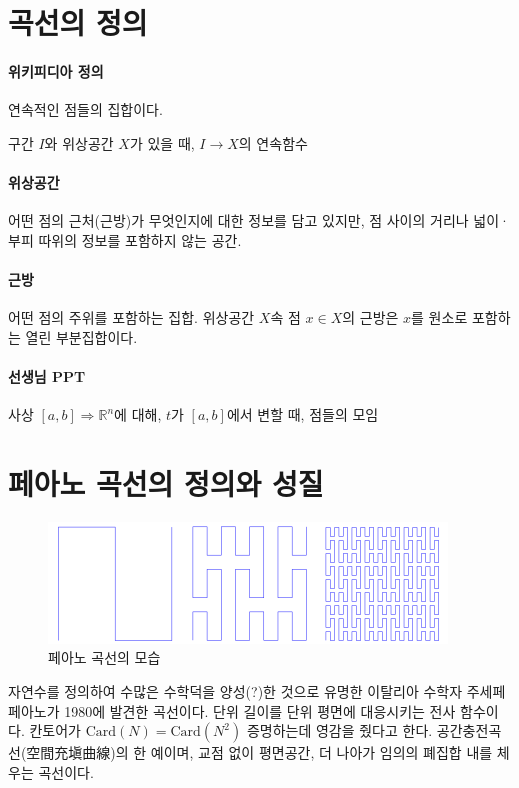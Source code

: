 \section{곡선의 정의}

\paragraph{위키피디아 정의}  

연속적인 점들의 집합이다.

구간 $I$와 위상공간 $X$가 있을 때, $I \to X$의 연속함수
\paragraph{위상공간} 
어떤 점의 근처(근방)가 무엇인지에 대한 정보를 담고 있지만, 점 사이의 거리나 넓이·부피 따위의 정보를 포함하지 않는 공간.

\paragraph{근방}
어떤 점의 주위를 포함하는 집합. 위상공간 $X$속 점 $x \in X$의 근방은 $x$를 원소로 포함하는 열린 부분집합이다.

\paragraph{선생님 PPT}
사상 $\left[ a, b\right] \Rightarrow \mathbb{R}^n$에 대해, $t$가 $\left[ a, b\right]$에서 변할 때, 점들의 모임
\section{페아노 곡선의 정의와 성질}

\begin{figure}[h!]
    \centering
    \includegraphics[width=.7\textwidth]{img/peano.png  }
    \caption{페아노 곡선의 모습}
    \label{texlive:exdit}
\end{figure}

자연수를 정의하여 수많은 수학덕을 양성(?)한 것으로 유명한 이탈리아 수학자 주세페 페아노가 1980에 발견한 곡선이다. 
단위 길이를 단위 평면에 대응시키는 전사 함수이다. 
칸토어가 $\mathrm{Card}(N)=\mathrm{Card}(N ^{2})$ 증명하는데 영감을 줬다고 한다.
공간충전곡선(空間充塡曲線)의 한 예이며, 교점 없이 평면공간, 더 나아가 임의의 폐집합 내를 체우는 곡선이다. 



